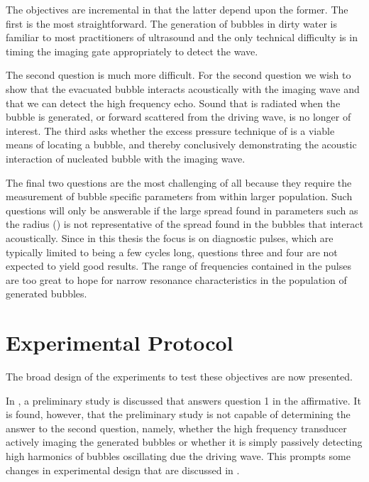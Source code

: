 The objectives are incremental in that the latter depend upon the former.
The first is the most straightforward.
The generation of bubbles in dirty water is familiar to most practitioners of ultrasound
and the only technical difficulty is in timing the imaging gate appropriately to detect the wave.

The second question is much more difficult.
For the second question we wish to show that the evacuated bubble interacts acoustically with the imaging wave
and that we can detect the high frequency echo.
Sound that is radiated when the bubble is generated,
or forward scattered from the driving wave, is no longer of interest.
The third asks whether the excess pressure technique of  is a viable means of locating a bubble, 
and thereby conclusively demonstrating the acoustic interaction of nucleated bubble with the imaging wave.

The final two questions are the most challenging of all because they require
the measurement of bubble specific parameters from within larger population.
Such questions will only be answerable if the large  spread found in parameters such
as the radius () is not representative of the spread found in the bubbles that interact acoustically.
Since in this thesis the focus is on diagnostic pulses, 
which are typically limited to being a few cycles long,
questions three and four are not expected to yield good results.
The range of frequencies contained in the pulses are too great to hope for narrow resonance characteristics in the population of generated bubbles.


\section{Experimental Protocol}\label{sec:exp:protocol}

The broad design of the experiments to test these objectives are now presented.

In , a preliminary study is discussed that 
answers question 1 in the affirmative.
It is found, however, that the preliminary study is not capable of determining the answer to 
the second question, namely,
whether the high frequency transducer actively imaging the generated bubbles
or whether it is simply passively detecting high harmonics
of bubbles oscillating due the driving wave.
This prompts some changes in experimental design that are discussed in .


